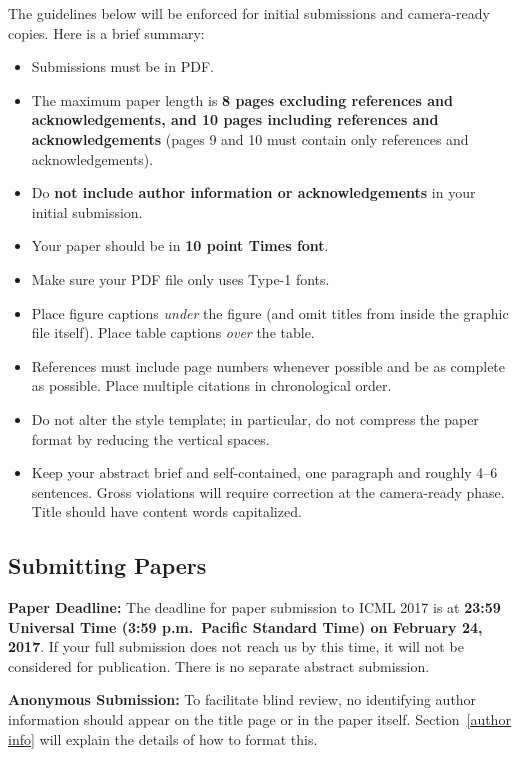 \documentclass{article}
\begin{document}
\ifx
The guidelines below will be enforced for initial submissions and
camera-ready copies.  Here is a brief summary:
\begin{itemize}
\item Submissions must be in PDF.
\item The maximum paper length is \textbf{8 pages excluding references and acknowledgements, and 10 pages
  including references and acknowledgements} (pages 9 and 10 must contain only references and acknowledgements).
\item Do \textbf{not include author information or acknowledgements} in your initial
submission. 
\item Your paper should be in \textbf{10 point Times font}.
\item Make sure your PDF file only uses Type-1 fonts.
\item Place figure captions {\em under} the figure (and omit titles from inside
the graphic file itself).  Place table captions {\em over} the table.
\item References must include page numbers whenever possible and be as complete
as possible.  Place multiple citations in chronological order.  
\item Do not alter the style template; in particular, do not compress the paper
format by reducing the vertical spaces.
\item Keep your abstract brief and self-contained, one
   paragraph and roughly 4--6 sentences.  Gross violations will require correction at the camera-ready phase.
  Title should have content words capitalized.
  

\end{itemize}

\subsection{Submitting Papers}

{\bf Paper Deadline:} The deadline for paper submission to ICML 2017
is at \textbf{23:59 Universal Time (3:59 p.m.\ Pacific Standard Time) on February 24, 2017}.
If your full submission does not reach us by this time, it will 
not be considered for publication. There is no separate abstract submission.

{\bf Anonymous Submission:} To facilitate blind review, no identifying
author information should appear on the title page or in the paper
itself.  Section~\ref{author info} will explain the details of how to
format this.
\end{document}
